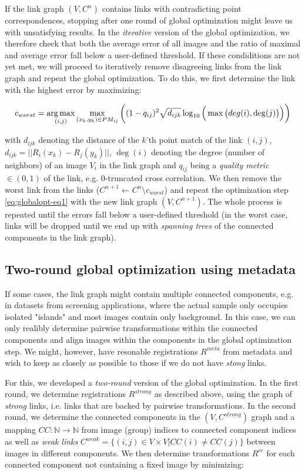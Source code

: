 If the link graph $(V,C^n)$ contains links with contradicting point correspondences, stopping after one round of global optimization might leave us with unsatisfying results. In the \emph{iterative} version of the global optimization, we therefore check that both the average error of all images and the ratio of maximal and average error fall below a user-defined threshold. If these condiditions are not yet met, we will proceed to iteratively remove disagreeing links from the link graph and repeat the global optimization. To do this, we first determine the link with the highest error by maximizing:

\begin{equation}
\label{eq:globalopt-eq3}
c_{worst} = \operatorname*{arg\,max}_{(i,j)} \max_{(x_k, y_k) \in PM_{ij}}\bigg( (1-q_{ij})^2 \sqrt{d_{ijk}} \log_{10}\Big(\max\big(deg(i), \deg(j)\big)\Big)\bigg) 
\end{equation}

with $d_{ijk}$ denoting the distance of the $k$'th point match of the link $(i,j)$, $d_{ijk} = || R_{i}(x_k) - R_{j}(y_k) ||$, $\deg(i)$ denoting the degree (number of neighbors) of an image $V_i$ in the link graph and $q_{ij}$ being a \emph{quality metric} $\in (0,1)$ of the link, e.g. 0-truncated cross correlation. We then remove the worst link from the links ($C^{n+1} \leftarrow C^{n} \setminus c_{worst}$) and repeat the optimization step \ref{eq:globalopt-eq1} with the new link graph $(V, C^{n+1})$. The whole process is repeated until the errors fall below a user-defined threshold (in the worst case, links will be dropped until we end up with \emph{spanning trees} of the connected components in the link graph). 

\subsection*{Two-round global optimization using metadata}

If some cases, the link graph might contain multiple connected components, e.g. in datasets from screening applications, where the actual sample only occupies isolated "islands" and most images contain only background. In this case, we can only realibly determine pairwise transformations within the connected components and align images within the components in the global optimization step. We might, however, have resonable registrations $R^{meta}$ from metadata and wish to keep as closely as possible to those if we do not have \emph{stong} links.

For this, we developed a \emph{two-round} version of the global optimization. In the first round, we determine registrations $R^{strong}$ as described above, using the graph of \emph{strong} links, i.e. links that are backed by pairwise transformations. In the second round, we determine the connected components in the $(V, C^{strong} )$ graph and a mapping $CC: \mathbb{N} \to \mathbb{N}$ from image (group) indices to  connected component indices as well as \emph{weak links} $C^{weak} = \{(i,j) \in V \times V | CC(i) \neq CC(j) \}$ between images in different components. We then determine transformations $R^{cc}$ for each connected component not containing a fixed image by minimizing:

